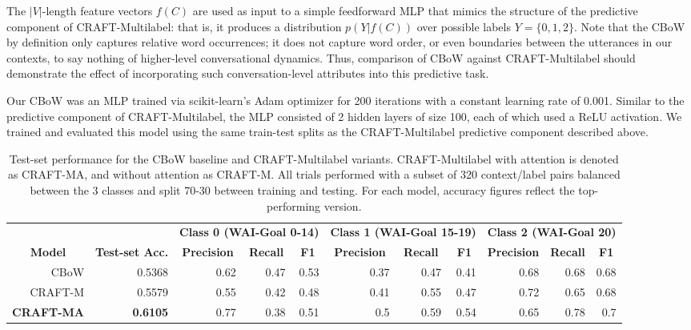 \documentclass{article}
\begin{document}
The $|V|$-length feature vectors $f(C)$ are used as input to a simple feedforward MLP that mimics the structure of the predictive component of CRAFT-Multilabel: that is, it produces a distribution $p(Y|f(C))$ over possible labels $Y=\{0,1,2\}$. Note that the CBoW by definition only captures relative word occurrences; it does not capture word order, or even boundaries between the utterances in our contexts, to say nothing of higher-level conversational dynamics. Thus, comparison of CBoW against CRAFT-Multilabel should demonstrate the effect of incorporating such conversation-level attributes into this predictive task.

Our CBoW was an MLP trained via scikit-learn's Adam optimizer \cite{scikit-learn} for 200 iterations with a constant learning rate of 0.001. Similar to the predictive component of CRAFT-Multilabel, the MLP consisted of 2 hidden layers of size 100, each of which used a ReLU activation. We trained and evaluated this model using the same train-test splits as the CRAFT-Multilabel predictive component described above.


\begin{table}[t]
  \centering
  \begin{tabular}{@{}rrrrrrrrrrr@{}}
  \toprule
   &
    \multicolumn{1}{c}{} &
    \multicolumn{3}{c}{\textbf{Class 0 (WAI-Goal 0-14)}} &
    \multicolumn{3}{c}{\textbf{Class 1 (WAI-Goal 15-19)}} &
    \multicolumn{3}{c}{\textbf{Class 2 (WAI-Goal 20)}} \\ \cmidrule(l){3-11} 
  \multicolumn{1}{c}{\textbf{Model}} &
    \multicolumn{1}{c}{\textbf{Test-set Acc.}} &
    \multicolumn{1}{c}{\textbf{Precision}} &
    \multicolumn{1}{c}{\textbf{Recall}} &
    \multicolumn{1}{c}{\textbf{F1}} &
    \multicolumn{1}{c}{\textbf{Precision}} &
    \multicolumn{1}{c}{\textbf{Recall}} &
    \multicolumn{1}{c}{\textbf{F1}} &
    \multicolumn{1}{c}{\textbf{Precision}} &
    \multicolumn{1}{c}{\textbf{Recall}} &
    \multicolumn{1}{c}{\textbf{F1}} \\ \midrule
  CBoW &
    0.5368 &
    0.62 &
    0.47 &
    0.53 &
    0.37 &
    0.47 &
    0.41 &
    0.68 &
    0.68 &
    0.68 \\
  CRAFT-M &
    0.5579 &
    0.55 &
    0.42 &
    0.48 &
    0.41 &
    0.55 &
    0.47 &
    0.72 &
    0.65 &
    0.68 \\
  \textbf{CRAFT-MA} &
    \textbf{0.6105} &
    0.77 &
    0.38 &
    0.51 &
    0.5 &
    0.59 &
    0.54 &
    0.65 &
    0.78 &
    0.7 \\ \bottomrule
  \end{tabular}
  \caption{Test-set performance for the CBoW baseline and CRAFT-Multilabel variants. CRAFT-Multilabel with attention is denoted as CRAFT-MA, and without attention as CRAFT-M. All trials performed with a subset of 320 context/label pairs balanced between the 3 classes and split 70-30 between training and testing. For each model, accuracy figures reflect the top-performing version.}
  \label{tab:results}
\end{table}
\end{document}
